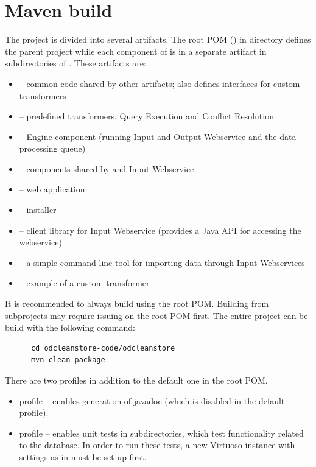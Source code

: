 \section{Maven build}
\label{sec:mavenBuild}
The project is divided into several artifacts. The root POM () in  directory defines the parent project while each component of \odcs is in a separate artifact in subdirectories of . These artifacts are:

\begin{itemize}
	\item {} -- common code shared by other artifacts; also defines interfaces for custom transformers
	\item {} -- predefined transformers, Query Execution and Conflict Resolution
	\item {} -- Engine component (running Input and Output Webservice and the data processing queue)
	\item {} -- components shared by  and Input Webservice
	\item {} -- \FE web application
	\item {} -- \odcs installer
	\item {} -- client library for Input Webservice (provides a Java API for accessing the webservice)
	\item {} -- a simple command-line tool for importing data through Input Webservices
	\item {} -- example of a custom transformer
\end{itemize}


It is recommended to always build using the root POM. Building from subprojects may require issuing  on the root POM first. The entire project can be build with the following command:

\begin{verbatim}
      cd odcleanstore-code/odcleanstore
      mvn clean package
\end{verbatim}

There are two profiles in addition to the default one in the root POM.

\begin{itemize}
	\item {} profile -- enables generation of javadoc (which is disabled in the default profile). 
	\item {} profile -- enables unit tests in  subdirectories, which test functionality related to the database. In order to run these tests, a new Virtuoso instance with settings as in  must be set up first.
\end{itemize}

